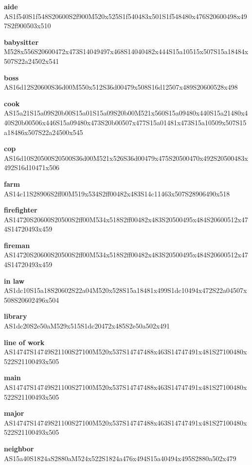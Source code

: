 \documentclass{article}
\begin{document}
\begin{glossary}

\textbf{aide}\\
AS1f540S1f548S20600S2f900M520x525S1f540483x501S1f548480x476S20600498x497S2f900503x510

\textbf{babysitter}\\
M528x556S20600472x473S14049497x468S14040482x444S15a10515x507S15a18484x507S22a24502x541

\textbf{boss}\\
AS16d12S20600S36d00M550x512S36d00479x508S16d12507x489S20600528x498

\textbf{cook}\\
AS15a21S15a09S20b00S15a01S15a09S20b00M521x560S15a09480x440S15a21480x440S20b00506x446S15a09480x473S20b00507x477S15a01481x473S15a10509x507S15a18486x507S22a24500x545

\textbf{cop}\\
AS16d10S20500S20500S36d00M521x526S36d00479x475S20500470x492S20500483x492S16d10471x506

\textbf{farm}\\
AS14c11S28906S2ff00M519x534S2ff00482x483S14c11463x507S28906490x518

\textbf{firefighter}\\
AS14720S20600S20500S2ff00M534x518S2ff00482x483S20500495x484S20600512x474S14720493x459

\textbf{fireman}\\
AS14720S20600S20500S2ff00M534x518S2ff00482x483S20500495x484S20600512x474S14720493x459

\textbf{in law}\\
AS1dc10S15a18S20602S22a04M520x528S15a18481x499S1dc10494x472S22a04507x508S20602496x504

\textbf{library}\\
AS1dc20S2e50aM529x515S1dc20472x485S2e50a502x491

\textbf{line of work}\\
AS14747S14749S21100S27100M520x537S14747488x463S14747491x481S27100480x522S21100493x505

\textbf{main}\\
AS14747S14749S21100S27100M520x537S14747488x463S14747491x481S27100480x522S21100493x505

\textbf{major}\\
AS14747S14749S21100S27100M520x537S14747488x463S14747491x481S27100480x522S21100493x505

\textbf{neighbor}\\
AS15a40S1824aS2880aM524x522S1824a476x494S15a40494x495S2880a502x479


\end{glossary}
\end{document}
